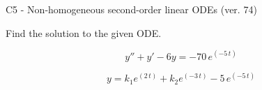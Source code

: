 \begin{exercise}
  \begin{exerciseTitle}C5 - Non-homogeneous second-order linear ODEs (ver. 74)\end{exerciseTitle}
  \begin{exerciseStatement}
    
Find the solution to the given ODE.

    
\[y''+y'-6y = -70 \, e^{\left(-5 \, t\right)}\]

  \end{exerciseStatement}
  \begin{exerciseAnswer}
    
\[y= k_{1} e^{\left(2 \, t\right)} + k_{2} e^{\left(-3 \, t\right)} - 5 \, e^{\left(-5 \, t\right)}\]

  \end{exerciseAnswer}
\end{exercise}